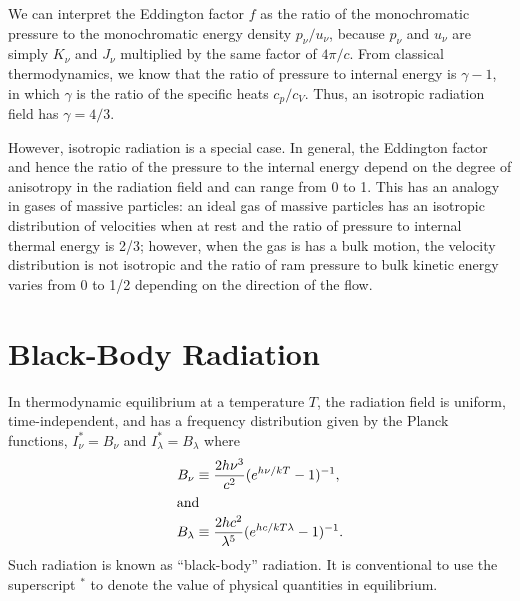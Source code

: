 \newslide

We can interpret the Eddington factor $f$ as the ratio
of the monochromatic pressure to the monochromatic energy
density $p_\nu/u_\nu$, because $p_\nu$ and $u_\nu$ are
simply $K_\nu$ and $J_\nu$ multiplied by the same factor of
$4\pi/c$. From classical thermodynamics, we know that the
ratio of pressure to internal energy is $\gamma - 1$, in
which $\gamma$ is the ratio of the specific heats $c_p/c_V$.
Thus, an isotropic radiation field has $\gamma = 4/3$.

However, isotropic radiation is a special case. In general,
the Eddington factor and hence the ratio of the pressure to
the internal energy depend on the degree of anisotropy in
the radiation field and can range from 0 to 1. This has an
analogy in gases of massive particles: an ideal gas of
massive particles has an isotropic distribution of
velocities when at rest and the ratio of pressure to
internal thermal energy is 2/3; however, when the gas is has
a bulk motion, the velocity distribution is not isotropic
and the ratio of ram pressure to bulk kinetic energy varies
from 0 to 1/2 depending on the direction of the flow.

\newslide

\section{Black-Body Radiation}


In thermodynamic equilibrium at a temperature $T$, the
radiation field is uniform, time-independent, and has a
frequency distribution given by the Planck functions,
$I_\nu^* = B_\nu$ and $I_\lambda^* = B_\lambda$ where
\begin{align}
B_\nu &\equiv \frac{2 h \nu^3}{c^2}
(e^{h\nu/kT} -1)^{-1},
\\
\intertext{and}
B_\lambda &\equiv \frac{2 h c^2}{\lambda ^5}
(e^{hc/kT\lambda} -1)^{-1}.
\end{align}
Such radiation is known as ``black-body'' radiation. It is conventional
to use the superscript $^*$ to denote the value of physical quantities
in equilibrium.

\newslide

